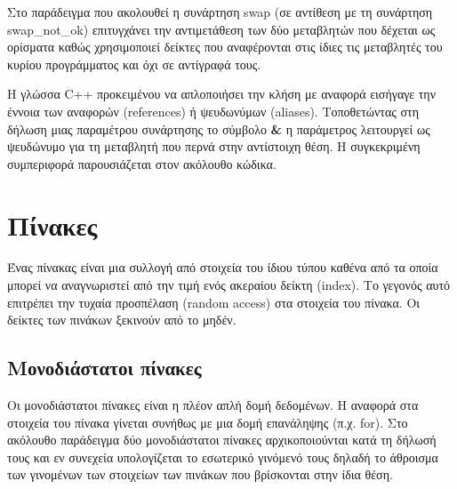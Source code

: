 Στο παράδειγμα που ακολουθεί η συνάρτηση swap (σε αντίθεση με τη συνάρτηση swap\_not\_ok) επιτυγχάνει την αντιμετάθεση των δύο μεταβλητών που δέχεται ως ορίσματα καθώς χρησιμοποιεί δείκτες που αναφέρονται στις ίδιες τις μεταβλητές του κυρίου προγράμματος και όχι σε αντίγραφά τους. 






Η γλώσσα C++ προκειμένου να απλοποιήσει την κλήση με αναφορά εισήγαγε την έννοια των αναφορών (references) ή ψευδωνύμων (aliases). Τοποθετώντας στη δήλωση μιας παραμέτρου συνάρτησης το σύμβολο \textbf{\&} η παράμετρος λειτουργεί ως ψευδώνυμο για τη μεταβλητή που περνά στην αντίστοιχη θέση. Η συγκεκριμένη συμπεριφορά παρουσιάζεται στον ακόλουθο κώδικα.






\section{Πίνακες}
Ένας  πίνακας είναι μια συλλογή από στοιχεία του ίδιου τύπου καθένα από τα οποία μπορεί να αναγνωριστεί από την τιμή ενός ακεραίου δείκτη (index).  Το γεγονός αυτό επιτρέπει την τυχαία προσπέλαση (random access) στα στοιχεία του πίνακα. Οι δείκτες των πινάκων ξεκινούν από το μηδέν. 

\subsection{Μονοδιάστατοι πίνακες}
Οι μονοδιάστατοι πίνακες είναι η πλέον απλή δομή δεδομένων. Η αναφορά στα στοιχεία του πίνακα γίνεται συνήθως με μια δομή επανάληψης (π.χ. for). Στο ακόλουθο παράδειγμα δύο μονοδιάστατοι πίνακες αρχικοποιούνται κατά τη δήλωσή τους και εν συνεχεία υπολογίζεται το εσωτερικό γινόμενό τους δηλαδή το άθροισμα των γινομένων των στοιχείων των πινάκων που βρίσκονται στην ίδια θέση.






